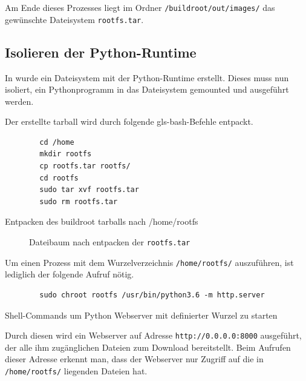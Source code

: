 Am Ende dieses Prozesses liegt im Ordner \texttt{/buildroot/out/images/} das gewünschte Dateisystem \texttt{rootfs.tar}.

\subsection{Isolieren der Python-Runtime}
\label{sec:isolieren}
In  wurde ein Dateisystem mit der Python-Runtime erstellt. Dieses muss nun isoliert, ein Pythonprogramm in das Dateisystem gemounted und ausgeführt werden.

Der erstellte tarball wird durch folgende \gls{gls-bash}-Befehle entpackt. 

\begin{listing}[h]
	\begin{verbatim}
		cd /home
		mkdir rootfs
		cp rootfs.tar rootfs/
		cd rootfs
		sudo tar xvf rootfs.tar
		sudo rm rootfs.tar
	\end{verbatim}
	\caption{Entpacken des buildroot tarballs nach /home/rootfs}
	\label{lst:untarRootfs}
\end{listing}


\begin{figure}[h]
	\centering
	\begin{minipage}{0.9\textwidth}
	\end{minipage}
	\caption{Dateibaum nach entpacken der \texttt{rootfs.tar}}
	\label{fig:baumNachUntar}
\end{figure}

Um einen Prozess mit dem Wurzelverzeichnis \texttt{/home/rootfs/} auszuführen, ist lediglich der folgende Aufruf nötig.
\begin{listing}[h]
	\begin{verbatim}
		sudo chroot rootfs /usr/bin/python3.6 -m http.server
	\end{verbatim}
	\caption{Shell-Commands um Python Webserver mit definierter Wurzel zu starten}
	\label{lst:pythonChrooted}
\end{listing}

Durch diesen wird ein Webserver auf Adresse \texttt{http://0.0.0.0:8000} ausgeführt, der alle ihm zugänglichen Dateien zum Download bereitstellt. Beim Aufrufen dieser Adresse erkennt man, dass der Webserver nur Zugriff auf die in \texttt{/home/rootfs/} liegenden Dateien hat.

